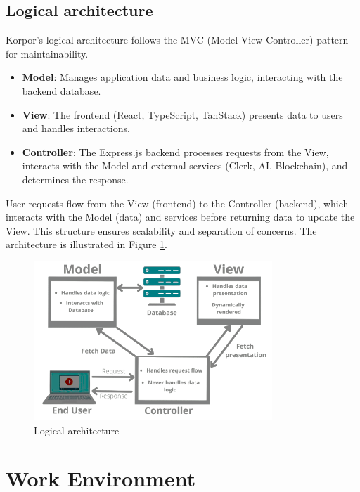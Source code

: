 \subsection{Logical architecture}

Korpor's logical architecture follows the MVC (Model-View-Controller) pattern \cite{SunardiMVC2019, GammaPatterns1994} for maintainability.
\begin{itemize}
    \item \textbf{Model}: Manages application data and business logic, interacting with the backend database.
    \item \textbf{View}: The frontend (React, TypeScript, TanStack) presents data to users and handles interactions.
    \item \textbf{Controller}: The Express.js backend processes requests from the View, interacts with the Model and external services (Clerk, AI, Blockchain), and determines the response.
\end{itemize}
User requests flow from the View (frontend) to the Controller (backend), which interacts with the Model (data) and services before returning data to update the View. This structure ensures scalability and separation of concerns. The architecture is illustrated in Figure \ref{fig:logical-architecture}.

\begin{figure}[htbp]
    \centering
    \includegraphics[width=0.8\textwidth]{images/logique.png}
    \caption{Logical architecture}
    \label{fig:logical-architecture}
\end{figure}

\section{Work Environment}

